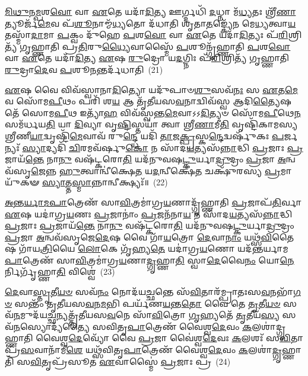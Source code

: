 \-\ul{𑌮𑌿}\-\-\ul{𑌥𑍁}\-𑌨\-\ul{𑌮𑍍𑌪}\-𑌶\-\ul{𑌵𑍋} 𑌵𑌾 \ul{𑌏}\-𑌤𑍇 𑌯𑌦𑌾᳴\-\ul{𑌦𑌿}\-𑌤𑍍𑌯 𑌊𑌰𑍍𑌗𑍍𑌦𑌧𑌿᳴ \ul{𑌦}\-𑌧𑍍𑌨𑌾 𑌮᳴\-\ul{𑌧𑍍𑌯}\-𑌤𑌃 𑌶𑍍𑌰𑍀᳴\-\ul{𑌣𑌾}\-𑌤𑍍𑌯𑍂𑌰𑍍𑌜᳴\-\ul{𑌮𑍇}\-𑌵 𑌪᳴\-\ul{𑌶𑍂}\-𑌨𑌾𑌮𑍍𑌮᳴\-\ul{𑌧𑍍𑌯}\-𑌤𑍋 𑌦᳴𑌧𑌾𑌤𑌿 𑌶𑍃𑌤𑌾\-\ul{𑌤}\-𑌙𑍍𑌕𑍍𑌯𑍇᳴𑌨 𑌮𑍇\-\ul{𑌧𑍍𑌯}\-𑌤𑍍𑌵𑌾\-\ul{𑌯} 𑌤𑌸𑍍𑌮𑌾᳴\-\ul{𑌦𑌾}\-𑌮𑌾 \ul{𑌪}\-𑌕𑍍𑌵𑌂 𑌦𑍁᳴𑌹𑍇 \ul{𑌪}\-𑌶\-\ul{𑌵𑍋} 𑌵𑌾 \ul{𑌏}\-𑌤𑍇 𑌯𑌦𑌾᳴\-\ul{𑌦𑌿}\-𑌤𑍍𑌯𑌃 𑌪᳴\-\ul{𑌰𑌿}\-𑌶𑍍𑌰𑌿𑌤𑍍𑌯᳴ 𑌗𑍃𑌹𑍍𑌣𑌾𑌤𑌿 𑌪𑍍𑌰\-\ul{𑌤𑌿}\-𑌰𑍁\-\ul{𑌧𑍍𑌯𑍈}\-𑌵𑌾𑌸𑍍𑌮𑍈᳴ \ul{𑌪}\-𑌶𑍂𑌨𑍍𑌗𑍃᳴𑌹𑍍𑌣𑌾𑌤𑌿 \ul{𑌪}\-𑌶\-\ul{𑌵𑍋} 𑌵𑌾 \ul{𑌏}\-𑌤𑍇 𑌯𑌦𑌾᳴\-\ul{𑌦𑌿}\-𑌤𑍍𑌯 \ul{𑌏}\-𑌷 \ul{𑌰𑍁}\-𑌦𑍍𑌰𑍋 𑌯\-\ul{𑌦}\-𑌗𑍍𑌨𑌿𑌃 𑌪᳴\-\ul{𑌰𑌿}\-𑌶𑍍𑌰𑌿𑌤𑍍𑌯᳴ 𑌗𑍃𑌹𑍍𑌣𑌾𑌤𑌿 \ul{𑌰𑍁}\-𑌦𑍍𑌰𑌾\-\ul{𑌦𑍇}\-𑌵 \ul{𑌪}\-𑌶𑍂\-\ul{𑌨}\-𑌨𑍍𑌤𑌰𑍍𑌦᳴𑌧𑌾𑌤𑌿~(21)

\-\ul{𑌏}\-𑌷 𑌵𑍈 𑌵𑌿𑌵᳴𑌸𑍍𑌵𑌾𑌨𑌾\-\ul{𑌦𑌿}\-𑌤𑍍𑌯𑍋 𑌯𑌦𑍁᳴𑌪𑌾𑍞\-\ul{𑌶𑍁}\-𑌸𑌵᳴\-\ul{𑌨𑌃} 𑌸 \ul{𑌏}\-𑌤\-\ul{𑌮𑍇}\-𑌵 𑌸𑍋᳴𑌮\-\ul{𑌪𑍀}\-𑌥𑌂 𑌪𑌰𑌿᳴ 𑌶\-\ul{𑌯} 𑌆 𑌤𑍃᳴𑌤𑍀𑌯𑌸\-\ul{𑌵}\-𑌨𑌾𑌦𑍍𑌵𑌿𑌵᳴𑌸𑍍𑌵 𑌆𑌦𑌿\-\ul{𑌤𑍍𑌯𑍈}\-𑌷 𑌤𑍇᳴ 𑌸𑍋𑌮\-\ul{𑌪𑍀}\-𑌥 𑌇𑌤𑍍𑌯𑌾᳴\-\ul{𑌹} 𑌵𑌿𑌵᳴𑌸𑍍𑌵𑌨𑍍𑌤\-\ul{𑌮𑍇}\-𑌵𑌾𑌽𑌽\-\ul{𑌦𑌿}\-𑌤𑍍𑌯𑍞 𑌸𑍋᳴𑌮\-\ul{𑌪𑍀}\-𑌥𑍇\-\ul{𑌨} 𑌸𑌮᳴𑌰𑍍𑌧𑌯\-\ul{𑌤𑌿} 𑌯𑌾 \ul{𑌦𑌿}\-𑌵𑍍𑌯𑌾 𑌵𑍃\-\ul{𑌷𑍍𑌟𑌿}\-𑌸𑍍𑌤𑌯𑌾॑ 𑌤𑍍𑌵𑌾 𑌶𑍍𑌰𑍀\-\ul{𑌣𑌾}\-𑌮𑍀\-\ul{𑌤𑌿} 𑌵𑍃𑌷𑍍𑌟𑌿᳴𑌕𑌾𑌮𑌸𑍍𑌯 𑌶𑍍𑌰𑍀𑌣𑍀\-\ul{𑌯𑌾}\-𑌦𑍍𑌵𑍃𑌷𑍍𑌟𑌿᳴\-\ul{𑌮𑍇}\-𑌵𑌾𑌵᳴ 𑌰𑍁\-\ul{𑌨𑍍𑌦𑍍𑌧𑍇} 𑌯𑌦𑌿᳴ \ul{𑌤𑌾}\-𑌜\-\ul{𑌕𑍍𑌪𑍍𑌰}\-𑌸𑍍𑌕\-\ul{𑌨𑍍𑌦𑍇}\-𑌦𑍍𑌵𑌰𑍍\mbox{}𑌷𑍁᳴𑌕𑌃 \ul{𑌪}\-𑌰𑍍𑌜𑌨𑍍𑌯𑌃᳴ \ul{𑌸𑍍𑌯𑌾}\-𑌦𑍍𑌯𑌦𑌿᳴ \ul{𑌚𑌿}\-𑌰𑌮𑌵᳴𑌰𑍍\mbox{}𑌷𑍁\-\ul{𑌕𑍋} 𑌨 𑌸𑌾᳴𑌦\-\ul{𑌯}\-𑌤𑍍𑌯𑌸᳴\-\ul{𑌨𑍍𑌨𑌾}\-𑌦𑍍𑌧𑌿 \ul{𑌪𑍍𑌰}\-𑌜𑌾𑌃 \ul{𑌪𑍍𑌰}\-𑌜𑌾𑌯᳴\-\ul{𑌨𑍍𑌤𑍇} 𑌨𑌾\-\ul{𑌨𑍁} 𑌵𑌷᳴𑌟𑍍𑌕𑌰𑍋\-\ul{𑌤𑌿} 𑌯𑌦᳴𑌨𑍁𑌵𑌷\-\ul{𑌟𑍍𑌕𑍁}\-॒𑌰𑍍𑌯𑌾\-\ul{𑌦𑍍𑌰𑍁}\-𑌦𑍍𑌰𑌂 \ul{𑌪𑍍𑌰}\-𑌜𑌾 \ul{𑌅}\-𑌨𑍍𑌵𑌵᳴𑌸𑍃\-\ul{𑌜𑍇}\-𑌨𑍍𑌨 \ul{𑌹𑍁}\-𑌤𑍍𑌵𑌾𑌨𑍍𑌵𑍀॑𑌕𑍍𑌷𑍇\-\ul{𑌤} 𑌯\-\ul{𑌦}\-𑌨𑍍𑌵𑍀𑌕𑍍𑌷𑍇᳴\-\ul{𑌤} 𑌚𑌕𑍍𑌷𑍁᳴𑌰𑌸𑍍𑌯 \ul{𑌪𑍍𑌰}\-𑌮𑌾𑌯𑍁᳴𑌕𑍟 \ul{𑌸𑍍𑌯𑌾}\-𑌤𑍍𑌤\-\ul{𑌸𑍍𑌮𑌾}\-𑌨𑍍𑌨𑌾𑌨𑍍𑌵𑍀𑌕𑍍𑌷𑍍𑌯𑌃᳴॥~(22)

{\anuvakamend[{\-\ul{𑌏}\-𑌵 \ul{𑌯}\-𑌜𑍍𑌞𑌾\-\ul{𑌜𑍍𑌜}\-𑌰𑌾\-\ul{𑌯𑍁} 𑌤\-\ul{𑌦𑍇}\-𑌵 𑌤\-\ul{𑌦}\-𑌨𑍍𑌤𑌰𑍍𑌦᳴𑌧𑌾\-\ul{𑌤𑌿} 𑌨 \ul{𑌸}\-𑌪𑍍𑌤𑌵𑌿𑍞᳴𑌶𑌤𑌿𑌶𑍍𑌚}]}%

\-\ul{𑌅}\-\-\ul{𑌨𑍍𑌤}\-\-\ul{𑌰𑍍𑌯𑌾}\-\-\ul{𑌮}\-\-\ul{𑌪𑌾}\-𑌤𑍍𑌰𑍇𑌣᳴ 𑌸𑌾\-\ul{𑌵𑌿}\-𑌤𑍍𑌰𑌮𑌾॑𑌗𑍍𑌰\-\ul{𑌯}\-𑌣𑌾𑌦𑍍𑌗𑍃᳴𑌹𑍍𑌣𑌾𑌤𑌿 \ul{𑌪𑍍𑌰}\-𑌜𑌾𑌪᳴\-\ul{𑌤𑌿}\-𑌰𑍍𑌵𑌾 \ul{𑌏}\-𑌷 𑌯𑌦𑌾॑𑌗𑍍𑌰\-\ul{𑌯}\-𑌣𑌃 \ul{𑌪𑍍𑌰}\-𑌜𑌾𑌨𑌾𑌂॑ \ul{𑌪𑍍𑌰}\-𑌜𑌨᳴𑌨𑌾\-\ul{𑌯} 𑌨 𑌸𑌾᳴𑌦\-\ul{𑌯}\-𑌤𑍍𑌯𑌸᳴\-\ul{𑌨𑍍𑌨𑌾}\-𑌦𑍍𑌧𑌿 \ul{𑌪𑍍𑌰}\-𑌜𑌾𑌃 \ul{𑌪𑍍𑌰}\-𑌜𑌾𑌯᳴\-\ul{𑌨𑍍𑌤𑍇} 𑌨𑌾\-\ul{𑌨𑍁} 𑌵𑌷᳴𑌟𑍍𑌕𑌰𑍋\-\ul{𑌤𑌿} 𑌯𑌦᳴𑌨𑍁𑌵𑌷\-\ul{𑌟𑍍𑌕𑍁}\-𑌰𑍍𑌯𑌾\-\ul{𑌦𑍍𑌰𑍁}\-𑌦𑍍𑌰𑌂 \ul{𑌪𑍍𑌰}\-𑌜𑌾 \ul{𑌅}\-𑌨𑍍𑌵𑌵᳴𑌸𑍃𑌜𑍇\-\ul{𑌦𑍇}\-𑌷 𑌵𑍈 𑌗𑌾᳴\-\ul{𑌯}\-𑌤𑍍𑌰𑍋 \ul{𑌦𑍇}\-𑌵𑌾\-\ul{𑌨𑌾𑌂} 𑌯𑌥𑍍𑌸᳴\-\ul{𑌵𑌿}\-𑌤𑍈𑌷 𑌗𑌾᳴𑌯\-\ul{𑌤𑍍𑌰𑌿}\-𑌯𑍈 \ul{𑌲𑍋}\-𑌕𑍇 𑌗𑍃᳴𑌹𑍍𑌯\-\ul{𑌤𑍇} 𑌯𑌦𑌾॑𑌗𑍍𑌰\-\ul{𑌯}\-𑌣𑍋 𑌯𑌦᳴𑌨𑍍𑌤𑌰𑍍𑌯𑌾𑌮\-\ul{𑌪𑌾}\-𑌤𑍍𑌰𑍇𑌣᳴ 𑌸𑌾\-\ul{𑌵𑌿}\-𑌤𑍍𑌰𑌮𑌾॑𑌗𑍍𑌰\-\ul{𑌯}\-𑌣𑌾\-\ul{𑌦𑍍𑌗𑍃}\-𑌹𑍍𑌣𑌾\-\ul{𑌤𑌿} 𑌸𑍍𑌵𑌾\-\ul{𑌦𑍇}\-𑌵𑍈\-\ul{𑌨𑌂} 𑌯𑍋\-\ul{𑌨𑍇}\-𑌰𑍍𑌨𑌿𑌰𑍍𑌗𑍃᳴𑌹𑍍𑌣𑌾\-\ul{𑌤𑌿} 𑌵𑌿𑌶𑍍𑌵𑍇॑~(23)

\-\ul{𑌦𑍇}\-𑌵𑌾\-\ul{𑌸𑍍𑌤𑍃}\-𑌤𑍀\-\ul{𑌯}\-\-\ul{𑍞} 𑌸𑌵᳴\-\ul{𑌨𑌂} 𑌨𑍋𑌦᳴𑌯\-\ul{𑌚𑍍𑌛}\-𑌨𑍍𑌤𑍇 𑌸᳴\-\ul{𑌵𑌿}\-𑌤𑌾𑌰᳴𑌮𑍍𑌪𑍍𑌰𑌾𑌤𑌃𑌸\-\ul{𑌵}\-𑌨𑌭𑌾᳴\-\ul{𑌗}\-\-\ul{𑍞} 𑌸𑌨𑍍𑌤𑌂᳴ 𑌤𑍃𑌤𑍀𑌯𑌸\-\ul{𑌵}\-𑌨\-\ul{𑌮}\-𑌭𑌿 𑌪𑌰𑍍𑌯᳴𑌣\-\ul{𑌯}\-𑌨𑍍𑌤\-\ul{𑌤𑍋} 𑌵𑍈 𑌤𑍇 \ul{𑌤𑍃}\-𑌤𑍀\-\ul{𑌯}\-\-\ul{𑍞} 𑌸𑌵᳴\-\ul{𑌨}\-𑌮𑍁𑌦᳴𑌯\-\ul{𑌚𑍍𑌛}\-\-\ul{𑌨𑍍}\-𑌯𑌤𑍍𑌤𑍃᳴𑌤𑍀𑌯𑌸\-\ul{𑌵}\-𑌨𑍇 𑌸𑌾᳴\-\ul{𑌵𑌿}\-𑌤𑍍𑌰𑍋 \ul{𑌗𑍃}\-𑌹𑍍𑌯𑌤𑍇᳴ \ul{𑌤𑍃}\-𑌤𑍀𑌯᳴\-\ul{𑌸𑍍𑌯} 𑌸𑌵᳴\-\ul{𑌨}\-𑌸𑍍𑌯𑍋𑌦𑍍𑌯᳴𑌤𑍍𑌯𑍈 𑌸𑌵𑌿𑌤𑍃\-\ul{𑌪𑌾}\-𑌤𑍍𑌰𑍇𑌣᳴ 𑌵𑍈𑌶𑍍𑌵\-\ul{𑌦𑍇}\-𑌵𑌂 \ul{𑌕}\-𑌲𑌶𑌾॑𑌦𑍍𑌗𑍃𑌹𑍍𑌣𑌾𑌤𑌿 𑌵𑍈𑌶𑍍𑌵\-\ul{𑌦𑍇}\-𑌵𑍍𑌯𑍋᳴ 𑌵𑍈 \ul{𑌪𑍍𑌰}\-𑌜𑌾 𑌵𑍈॑𑌶𑍍𑌵\-\ul{𑌦𑍇}\-𑌵𑌃 \ul{𑌕}\-𑌲𑌶𑌃᳴ 𑌸\-\ul{𑌵𑌿}\-𑌤𑌾 𑌪𑍍𑌰᳴\-\ul{𑌸}\-𑌵𑌾𑌨𑌾᳴𑌮𑍀\-\ul{𑌶𑍇} 𑌯𑌥𑍍𑌸᳴𑌵𑌿𑌤𑍃\-\ul{𑌪𑌾}\-𑌤𑍍𑌰𑍇𑌣᳴ 𑌵𑍈𑌶𑍍𑌵\-\ul{𑌦𑍇}\-𑌵𑌂 \ul{𑌕}\-𑌲𑌶𑌾॑\-\ul{𑌦𑍍𑌗𑍃}\-𑌹𑍍𑌣𑌾𑌤𑌿᳴ 𑌸\-\ul{𑌵𑌿}\-𑌤𑍃𑌪𑍍𑌰᳴𑌸𑍂𑌤 \ul{𑌏}\-𑌵𑌾𑌸𑍍𑌮𑍈॑ \ul{𑌪𑍍𑌰}\-𑌜𑌾𑌃 𑌪𑍍𑌰~(24)

